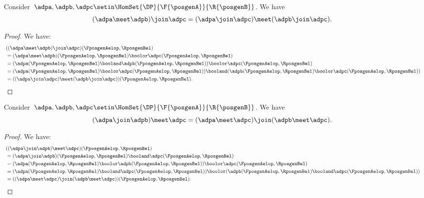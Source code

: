 \begin{lemma}
    \label{lem:vee_wedge}
    Consider~$\adpa,\adpb,\adpc\setin \HomSet{\DP}{\F{\posgenA}}{\R{\posgenB}}$.
    We have
    \begin{equation}
        (\adpa \meet \adpb)
        \join \adpc=(\adpa \join \adpc) \meet (\adpb\join \adpc).
    \end{equation}
\end{lemma}
\begin{proof}
    We have:
    \begin{equation}
        \begin{aligned}
            ~ & ((\adpa \meet \adpb)\join \adpc)(\FposgenAelop,\RposgenBel) \\
              & =
            (\adpa \meet \adpb)(\FposgenAelop,\RposgenBel)\boolor \adpc(\FposgenAelop,\RposgenBel) \\
              & =(\adpa(\FposgenAelop,\RposgenBel) \booland \adpb(\FposgenAelop,\RposgenBel))\boolor \adpc(\FposgenAelop,\RposgenBel) \\
              & =(\adpa(\FposgenAelop,\RposgenBel) \boolor  \adpc(\FposgenAelop,\RposgenBel)) \booland (\adpb(\FposgenAelop,\RposgenBel)\boolor \adpc(\FposgenAelop,\RposgenBel)) \\
              & =((\adpa \join \adpc) \meet (\adpb\join \adpc))(\FposgenAelop,\RposgenBel).
        \end{aligned}
    \end{equation}
\end{proof}

\begin{lemma}
    \label{lem:wedge_vee}
    Consider~$\adpa,\adpb,\adpc\setin \HomSet{\DP}{\F{\posgenA}}{\R{\posgenB}}$.
    We have
    \begin{equation}
        (\adpa \join \adpb)
        \meet \adpc=(\adpa \meet \adpc) \join (\adpb\meet \adpc).
    \end{equation}
\end{lemma}
\begin{proof}
    We have:
    \begin{equation}
        \begin{aligned}
            ~ & ((\adpa \join \adpb)\meet \adpc)(\FposgenAelop,\RposgenBel) \\
              & = (\adpa \join \adpb)(\FposgenAelop,\RposgenBel)\booland \adpc(\FposgenAelop,\RposgenBel) \\
              & =(\adpa(\FposgenAelop,\RposgenBel) \boolor \adpb(\FposgenAelop,\RposgenBel))\boolor \adpc(\FposgenAelop,\RposgenBel) \\
              & =(\adpa(\FposgenAelop,\RposgenBel) \booland  \adpc(\FposgenAelop,\RposgenBel)) \boolor (\adpb(\FposgenAelop,\RposgenBel)\booland \adpc(\FposgenAelop,\RposgenBel)) \\
              & =((\adpa \meet \adpc) \join (\adpb\meet \adpc))(\FposgenAelop,\RposgenBel).
        \end{aligned}
    \end{equation}
\end{proof}

